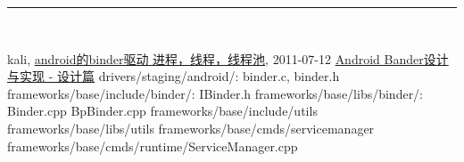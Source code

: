 \documentclass[a4paper,11pt]{article}
\begin{document}
\noindent\rule[-1ex]{\textwidth}{3pt}\\[2.0ex] 
\begin{thebibliography}{Binder}
     kali,
        \href{http://blog.sina.com.cn/s/blog_69f669470100s40o.html}{android的binder驱动 进程，线程，线程池},
        2011-07-12
     \href{http://blog.csdn.net/universus/article/details/6211589}{Android Bander设计与实现 - 设计篇}
    drivers/staging/android/: binder.c, binder.h
    frameworks/base/include/binder/: IBinder.h
    frameworks/base/libs/binder/:  Binder.cpp BpBinder.cpp
     frameworks/base/include/utils
     frameworks/base/libs/utils 
     frameworks/base/cmds/servicemanager
     frameworks/base/cmds/runtime/ServiceManager.cpp
\end{thebibliography}
\printindex

\end{document}
